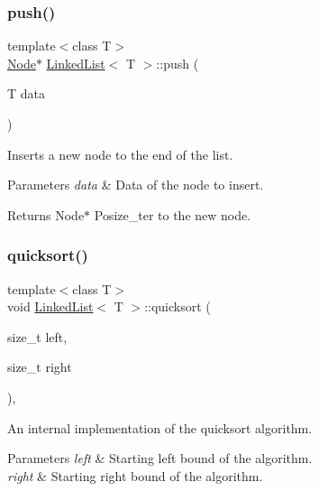 \subsubsection{\texorpdfstring{push()}{push()}}
{\footnotesize\ttfamily template$<$class T$>$ \\
\hyperlink{structLinkedList_1_1Node}{Node}$\ast$ \hyperlink{classLinkedList}{Linked\+List}$<$ T $>$\+::push (\begin{DoxyParamCaption}\item[{T}]{data }\end{DoxyParamCaption})\hspace{0.3cm}{\ttfamily [inline]}}



Inserts a new node to the end of the list. 


\begin{DoxyParams}{Parameters}
{\em data} & Data of the node to insert.\\
\hline
\end{DoxyParams}
\begin{DoxyReturn}{Returns}
Node$\ast$ Posize\+\_\+ter to the new node. 
\end{DoxyReturn}
\mbox{\label{classLinkedList_a38612b71d816fec54ea379d0b8daec76}} 
\subsubsection{\texorpdfstring{quicksort()}{quicksort()}}
{\footnotesize\ttfamily template$<$class T$>$ \\
void \hyperlink{classLinkedList}{Linked\+List}$<$ T $>$\+::quicksort (\begin{DoxyParamCaption}\item[{size\+\_\+t}]{left,  }\item[{size\+\_\+t}]{right }\end{DoxyParamCaption})\hspace{0.3cm}{\ttfamily [inline]}, {\ttfamily [private]}}



An internal implementation of the quicksort algorithm. 


\begin{DoxyParams}{Parameters}
{\em left} & Starting left bound of the algorithm. \\
\hline
{\em right} & Starting right bound of the algorithm. \\
\hline
\end{DoxyParams}
\mbox{\label{classLinkedList_ab9aa6e03f271785f6b488d8c4cc3f3c7}} 
